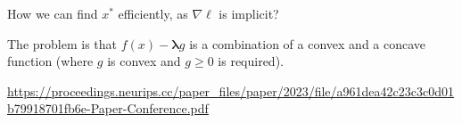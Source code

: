 \documentclass[10pt,a4paper]{article}
\begin{document}

How we can find $x^*$ efficiently, as $\nabla \ell$ is implicit? %

The problem is that $f(x)-\mathbf{\lambda}g$ is a combination of a convex and a concave function (where $g$ is convex and $g\geq 0$ is required).

\url{https://proceedings.neurips.cc/paper_files/paper/2023/file/a961dea42c23c3c0d01b79918701fb6e-Paper-Conference.pdf}







\end{document}
